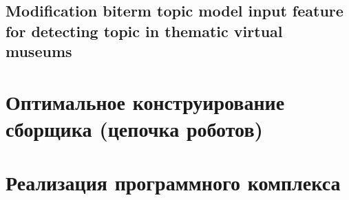 \subsection{Modification biterm topic model input feature for detecting topic in thematic virtual museums}\label{subsec:ch4/sec2/sub5}

\section{Оптимальное конструирование сборщика (цепочка роботов)}\label{sec:ch4/sect3}

\section{Реализация программного комплекса}\label{sec:ch4/sect4}

\FloatBarrier

